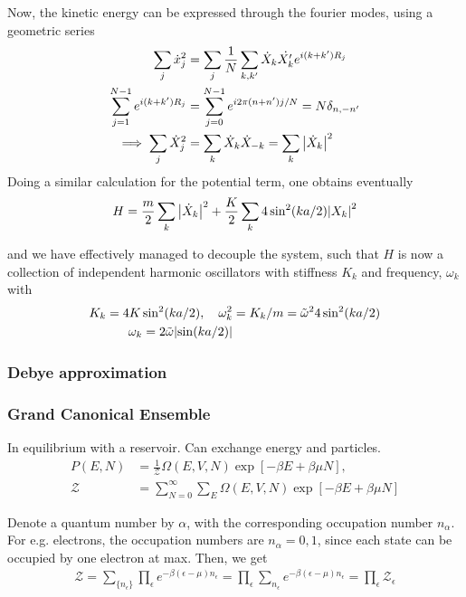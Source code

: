 \documentclass[a4paper, english, 12pt]{article}
\begin{document}
\begin{multicols*}{2}
Now, the kinetic energy can be expressed through the fourier modes, using a geometric series 
\begin{align*}
    \sum_j \dot{x}_j^2 &= \sum_j \frac{1}{N}\sum_{k,k'}\dot{X}_k \dot{X_k'} e^{i(k+k')R_j} \\ 
    \sum_{j=1}^{N-1} e^{i(k+k')R_j} &= \sum_{j=0}^{N-1}e^{i2\pi(n+n') j/N} = N\delta_{n,-n'} \\ 
    \implies \sum_j \dot{X}_j^2 &= \sum_k \dot{X}_k \dot{X}_{-k} = \sum_k \abs{\dot{X}_k}^2 
\end{align*}
Doing a similar calculation for the potential term, one obtains eventually 
\begin{align*}
    H = \frac{m}{2} \sum_k \abs{\dot{X}_k}^2 + \frac{K}{2} \sum_k 4\sin^2(ka/2) \abs{X_k}^2
\end{align*}

and we have effectively managed to decouple the system, such that $H$ is now a collection of independent harmonic oscillators with stiffness $K_k$ and frequency, $\omega_k$ with 
\begin{align*}
    K_k = 4K \sin^2(ka/2),\quad \omega_k^2 &= K_k/m = \tilde{\omega}^2 4\sin^2(ka/2) \\
    \omega_k = 2 \tilde{\omega}\abs{\sin(ka/2)}
\end{align*}


\subsubsection*{Debye approximation}




\subsubsection*{\scriptsize Grand Canonical Ensemble}
In equilibrium with a reservoir. Can exchange energy and particles. 
\begin{align*}
    P(E,N) &= \frac{1}{\mathcal{Z}}\Omega(E,V,N) \exp[-\beta E + \beta \mu N], \\
    \mathcal{Z} &= \sum_{N=0}^\infty \sum_E \Omega(E,V,N)\exp[-\beta E + \beta \mu N]
\end{align*}

Denote a quantum number by $\alpha$, with the corresponding occupation number $n_\alpha$. For e.g. electrons, the occupation numbers are $n_\alpha=0,1$, since each state can be occupied by one electron at max. Then, we get 
\begin{align*}
    \mathcal{Z} = \sum_{\{n_\epsilon\}} \prod_\epsilon e^{-\beta(\epsilon-\mu)n_\epsilon} = \prod_\epsilon \sum_{n_\epsilon} e^{-\beta(\epsilon-\mu)n_\epsilon} = \prod_\epsilon \mathcal{Z}_\epsilon
\end{align*} 



\end{multicols*}
\end{document}
